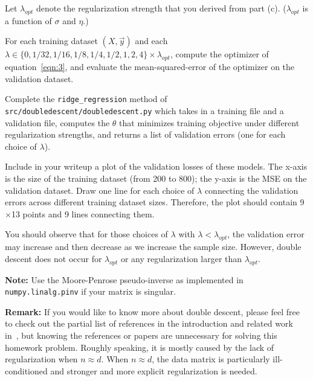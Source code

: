 Let $\lambda_{opt}$ denote the regularization strength that you derived from part (c). ($\lambda_{opt}$  is a function of $\sigma$ and $\eta$.)

For each training dataset $(X, \vec{y})$ and each $\lambda \in \{0, 1/32, 1/16, 1/8, 1/4 , 1/2, 1, 2, 4\} \times \lambda_{opt}$, compute the optimizer of equation~\eqref{eqn:3}, and evaluate the mean-squared-error of the optimizer on the validation dataset. 

Complete the \texttt{ridge\_regression} method of \texttt{src/doubledescent/doubledescent.py} which takes in a training file and a validation file, computes the $\theta$ that minimizes training objective under different regularization strengths, and returns a list of validation errors (one for each choice of $\lambda$).

Include in your writeup a plot of the validation losses of these models. The x-axis is the size of the training dataset (from 200 to 800); the y-axis is the MSE on the validation dataset. Draw one line for each choice of $\lambda$ connecting the validation errors across different training dataset sizes. Therefore, the plot should contain 9$\times$13 points and 9 lines connecting them. 

You should observe that for those choices of $\lambda$ with $\lambda<\lambda_{opt}$, the validation error may increase and then decrease as we increase the sample size. 
However, double descent does not occur for $\lambda_{opt}$ or any regularization larger than $\lambda_{opt}$. 

\textbf{Note:} Use the Moore-Penrose pseudo-inverse as implemented in \texttt{numpy.linalg.pinv} if your matrix is singular.

\textbf{Remark: } If you would like to know more about double descent, please feel free to check out the partial list of references in the introduction and related work in~\cite{Nakkiran}, but knowing the references or papers are unnecessary for solving this homework problem. Roughly speaking, it is mostly caused by the lack of regularization when $n \approx d$. When $n\approx d$, the data matrix is particularly ill-conditioned and stronger and more explicit regularization is needed.
